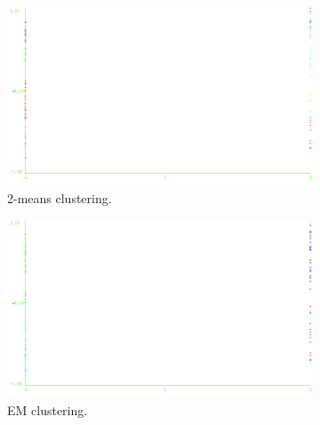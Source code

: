 \documentclass[11pt, letterpaper]{article}            %
\begin{document}
\begin{figure}[htbp]
  \centering
  \begin{subfigure}[b]{0.32\textwidth}
    \includegraphics[width=\textwidth]{./gfx/km35.png}
    \caption{2-means clustering.\label{fig:svlag:km}}
  \end{subfigure}
  \hfill
  \begin{subfigure}[b]{0.32\textwidth}
    \includegraphics[width=\textwidth]{./gfx/em35.png}
    \caption{EM clustering.\label{fig:svlag:em}}
  \end{subfigure}
  \hfill
  \begin{subfigure}[b]{0.32\textwidth}

\end{subfigure}
\end{figure}
\end{document}

